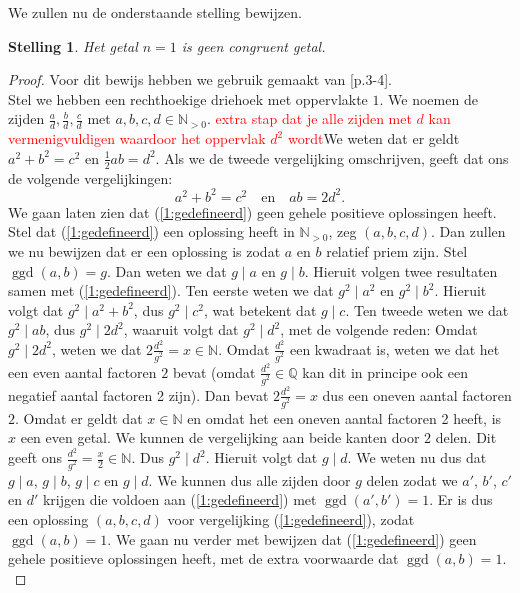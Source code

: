 \documentclass[12pt,reqno]{article}
\newcommand*{\NN}{\ensuremath{\mathbb{N}}}
\newcommand*{\QQ}{\ensuremath{\mathbb{Q}}}
\newcommand*{\NO}{\ensuremath{\mathbb{N}_{>0}}}
\theoremstyle{theorem}
\newtheorem{theorem}{Stelling}
\theoremstyle{definition}
\DeclareMathOperator{\ggd}{ggd}
\begin{document}
	We zullen nu de onderstaande stelling bewijzen.
	\begin{theorem}
		Het getal $n=1$ is geen congruent getal.
	\end{theorem}
	\begin{proof}
		Voor dit bewijs hebben we gebruik gemaakt van \cite{Conrad}[p.3-4].\\
		Stel we hebben een rechthoekige driehoek met oppervlakte $1$. We noemen de zijden $\frac{a}{d}, \frac{b}{d}, \frac{c}{d}$ met $a,b,c,d\in\NO$. \textcolor{red}{extra stap dat je alle zijden met $d$ kan vermenigvuldigen waardoor het oppervlak $d^2$ wordt}We weten dat er geldt $a^2 + b^2 = c ^2$ en $\frac{1}{2}ab = d^2$. Als we de tweede vergelijking omschrijven, geeft dat ons de volgende vergelijkingen:
		\begin{equation}\label{1:gedefineerd}
			a^2 + b^2 = c^2 \quad \text{en} \quad ab = 2d^2.
		\end{equation}
		We gaan laten zien dat (\ref{1:gedefineerd}) geen gehele positieve oplossingen heeft.\\
		
		Stel dat (\ref{1:gedefineerd}) een oplossing heeft in $\NO$, zeg $(a, b, c, d)$. Dan zullen we nu bewijzen dat er een oplossing is zodat $a$ en $b$ relatief priem zijn. Stel $\ggd(a,b) = g$. Dan weten we dat $g \mid a$ en $g \mid b$. Hieruit volgen twee resultaten samen met (\ref{1:gedefineerd}). Ten eerste weten we dat $g^2 \mid a^2$ en $g^2 \mid b^2$. Hieruit volgt dat $g^2 \mid a^2 + b^2$, dus $g^2 \mid c^2$, wat betekent dat $g \mid c$. Ten tweede weten we dat $g^2 \mid ab$, dus $g^2 \mid 2d^2$, waaruit volgt dat $g^2 \mid d^2$, met de volgende reden: Omdat $g^2 \mid 2d^2$, weten we dat $2\frac{d^2}{g^2} = x \in\NN$. Omdat $\frac{d^2}{g^2}$ een kwadraat is, weten we dat het een even aantal factoren $2$ bevat (omdat $\frac{d^2}{g^2}\in\QQ$ kan dit in principe ook een negatief aantal factoren 2 zijn). Dan bevat $2\frac{d^2}{g^2} = x$ dus een oneven aantal factoren $2$. Omdat er geldt dat $x \in\NN$ en omdat het een oneven aantal factoren 2 heeft, is $x$ een even getal. We kunnen de vergelijking aan beide kanten door $2$ delen. Dit geeft ons $\frac{d^2}{g^2}=\frac{x}{2} \in\NN$. Dus $g^2 \mid d^2$. Hieruit volgt dat $g \mid d$. We weten nu dus dat $g \mid a$, $g \mid b$, $g \mid c$ en $g \mid d$. We kunnen dus alle zijden door $g$ delen zodat we $a'$, $b'$, $c'$ en $d'$ krijgen die voldoen aan (\ref{1:gedefineerd}) met $\ggd(a',b') = 1$. Er is dus een oplossing $(a,b,c,d)$ voor vergelijking (\ref{1:gedefineerd}), zodat $\ggd(a,b)=1$. We gaan nu verder met bewijzen dat (\ref{1:gedefineerd}) geen gehele positieve oplossingen heeft, met de extra voorwaarde dat $\ggd(a,b) = 1$.\\
		

\end{proof}
\end{document}

